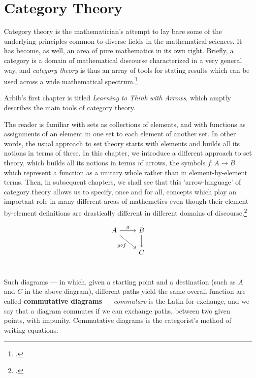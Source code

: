 \chapter{Category Theory}

Category theory is the mathematician's attempt to lay bare some of the 
underlying principles common to diverse fields in the mathematical sciences. It 
has become, as well, an area of pure mathematics in its own right. Briefly, a 
category is a domain of mathematical discourse characterized in a very general 
way, and \emph{category theory} is thus an array of tools for stating results which can 
be used across a wide mathematical spectrum.\footcite{arbib1975} 

Arbib's first chapter is titled \emph{Learning to Think with Arrows}, which amptly describes the main tools of category theory.


The reader is familiar with sets as collections of elements, and with functions 
as assignments of an element in one set to each element of another set. In other 
words, the usual approach to set theory starts with elements and builds all its 
notions in terms of these. In this chapter, we introduce a different approach to 
set theory, which builds all its notions in terms of arrows, the symbols $f: A \to B$ 
which represent a function as a unitary whole rather than in element-by-element 
terms. Then, in subsequent chapters, we shall see that this 'arrow-language' of 
category theory allows us to specify, once and for all, concepts which play an 
important role in many different areas of mathemetics even though their element- 
by-element definitions are drastically different in different domains of discourse.\footcite{arbib1975} 

\[
\begin{tikzcd}[scale=2.0]
A \arrow[dr, swap, "g \circ f"] \arrow[r, "g"] & B  \arrow[d]\\
& C\\
\end{tikzcd}
\]

Such diagrams — in which, given a starting point and a destination (such as 
$A$ and $C$ in the above diagram), different paths yield the same overall function are called 
\textbf{commutative diagrams} — \textit{commutare} is the Latin for exchange, and we say that a diagram 
commutes if we can exchange paths, between two given points, with impunity. 
Commutative diagrams is the categorist's method of writing equations. 


